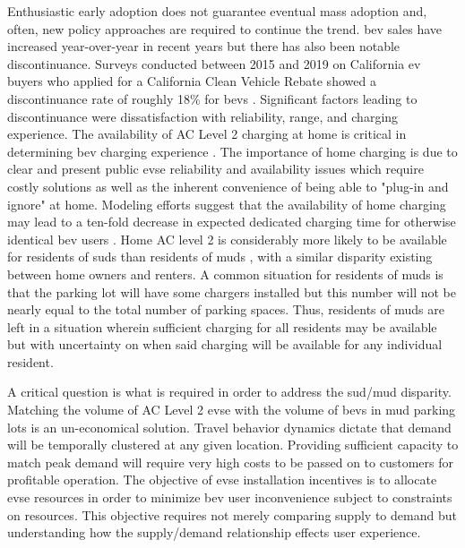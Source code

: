 \documentclass[letterpaper]{sae}
\begin{document}
Enthusiastic early adoption does not guarantee eventual mass adoption and, often, new policy approaches are required to continue the trend. \gls{bev} sales have increased year-over-year in recent years but there has also been notable discontinuance. Surveys conducted between 2015 and 2019 on California \gls{ev} buyers who applied for a California Clean Vehicle Rebate showed a discontinuance rate of roughly 18\% for \glspl{bev} \cite{Hardman_2021}. Significant factors leading to discontinuance were dissatisfaction with reliability, range, and charging experience. The availability of AC Level 2 charging at home is critical in determining \gls{bev} charging experience \cite{Lee_2020,Hardman_2018}. The importance of home charging is due to clear and present public \gls{evse} reliability and availability issues \cite{Karanam_2023,Liu_2023,David_2017} which require costly solutions \cite{Gamage_2023,Tal_2022} as well as the inherent convenience of being able to "plug-in and ignore" at home. Modeling efforts suggest that the availability of home charging may lead to a ten-fold decrease in expected dedicated charging time for otherwise identical \gls{bev} users \cite{rabinowitz_IEEE_Access_2023,Dixon_2020}. Home AC level 2 is considerably more likely to be available for residents of \glspl{sud} than residents of \glspl{mud} \cite{Yanbo_2021}, with a similar disparity existing between home owners and renters. A common situation for residents of \glspl{mud} is that the parking lot will have some chargers installed but this number will not be nearly equal to the total number of parking spaces. Thus, residents of \glspl{mud} are left in a situation wherein sufficient charging for all residents may be available but with uncertainty on when said charging will be available for any individual resident.

A critical question is what is required in order to address the \gls{sud}/\gls{mud} disparity. Matching the volume of AC Level 2 \gls{evse} with the volume of \glspl{bev} in \gls{mud} parking lots is an un-economical solution. Travel behavior dynamics dictate that demand will be temporally clustered at any given location. Providing sufficient capacity to match peak demand will require very high costs to be passed on to customers for profitable operation. The objective of \gls{evse} installation incentives is to allocate \gls{evse} resources in order to minimize \gls{bev} user inconvenience subject to constraints on resources. This objective requires not merely comparing supply to demand but understanding how the supply/demand relationship effects user experience.
\end{document}
